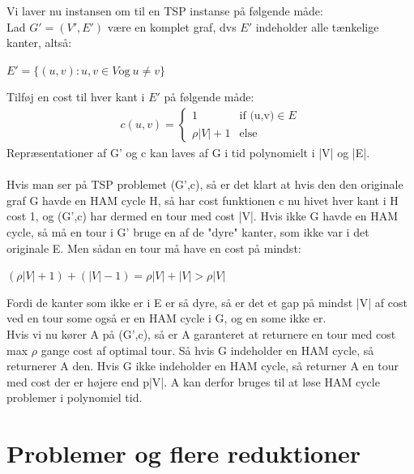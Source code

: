 \documentclass{article}
\begin{document}
Vi laver nu instansen om til en TSP instanse på følgende måde:\\
Lad $G' = (V',E')$ være en komplet graf, dvs $E'$ indeholder alle tænkelige kanter, altså:
\begin{center}
	$E' = \{(u,v):u,v\in V \text{og} \ u \neq v\}$
\end{center} 
Tilføj en cost til hver kant i $E'$ på følgende måde:
\begin{gather*}  
c(u,v)= 
\begin{cases}
  1 & \text{if (u,v)} \in E\\    
  \rho |V| +1 & \text{else}
\end{cases}
\end{gather*}
Repræsentationer af G' og c kan laves af G i tid polynomielt i |V| og |E|.\\\\

Hvis man ser på TSP problemet (G',c), så er det klart at hvis den den originale graf G havde en HAM cycle H, så har cost funktionen c nu hivet hver kant i H cost 1, og (G',c) har dermed en tour med cost |V|. Hvis ikke G havde en HAM cycle, så må en tour i G' bruge en af de "dyre" kanter, som ikke var i det originale E. Men sådan en tour må have en cost på mindst:
\begin{center}
	$(\rho |V| +1) + (|V|-1) = \rho |V| + |V|  > \rho |V|$
\end{center}
Fordi de kanter som ikke er i E er så dyre, så er det et gap på mindst |V| af cost ved en tour some også er en HAM cycle i G, og en some ikke er.\\

Hvis vi nu kører A på (G',c), så er A garanteret at returnere en tour med cost max $\rho$ gange cost af optimal tour. Så hvis G indeholder en HAM cycle, så returnerer A den. Hvis G ikke indeholder en HAM cycle, så returner A en tour med cost der er højere end p|V|. A kan derfor bruges til at løse HAM cycle problemer i polynomiel tid.

\section{Problemer og flere reduktioner}

\end{document}
